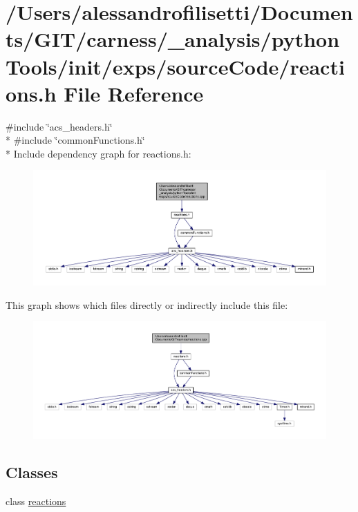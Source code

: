 \hypertarget{a00076}{\section{/\-Users/alessandrofilisetti/\-Documents/\-G\-I\-T/carness/\-\_\-analysis/python\-Tools/init/exps/source\-Code/reactions.h File Reference}
\label{a00076}
}
{\ttfamily \#include \char`\"{}acs\-\_\-headers.\-h\char`\"{}}\\*
{\ttfamily \#include \char`\"{}common\-Functions.\-h\char`\"{}}\\*
Include dependency graph for reactions.\-h\-:
\nopagebreak
\begin{figure}[H]
\begin{center}
\leavevmode
\includegraphics[width=350pt]{a00196}
\end{center}
\end{figure}
This graph shows which files directly or indirectly include this file\-:
\nopagebreak
\begin{figure}[H]
\begin{center}
\leavevmode
\includegraphics[width=350pt]{a00197}
\end{center}
\end{figure}
\subsection*{Classes}
\begin{DoxyCompactItemize}
\item 
class \hyperlink{a00021}{reactions}
\end{DoxyCompactItemize}
